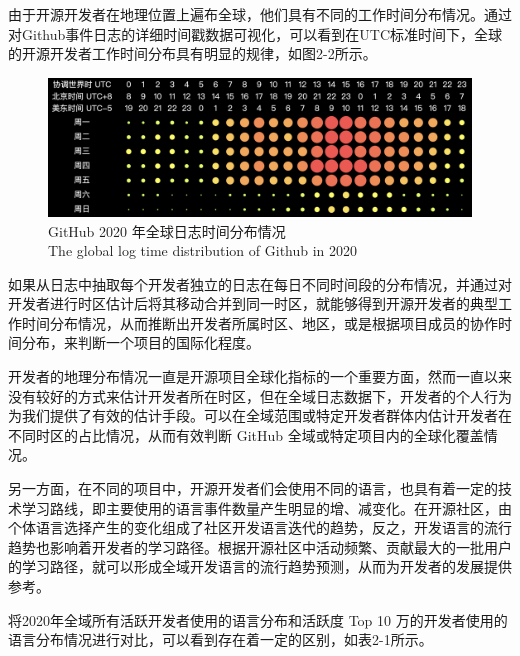 \par 由于开源开发者在地理位置上遍布全球，他们具有不同的工作时间分布情况。通过对Github事件日志的详细时间戳数据可视化，可以看到在UTC标准时间下，全球的开源开发者工作时间分布具有明显的规律，如图2-2所示。
\begin{figure}[H]
    \centering
    \includegraphics[width=130mm]{./figures/image2-2.png}
    \caption{GitHub 2020 年全球日志时间分布情况\\The global log time distribution of Github in 2020}
\end{figure}

\par 如果从日志中抽取每个开发者独立的日志在每日不同时间段的分布情况，并通过对开发者进行时区估计后将其移动合并到同一时区，就能够得到开源开发者的典型工作时间分布情况，从而推断出开发者所属时区、地区，或是根据项目成员的协作时间分布，来判断一个项目的国际化程度。

\par 开发者的地理分布情况一直是开源项目全球化指标的一个重要方面，然而一直以来没有较好的方式来估计开发者所在时区，但在全域日志数据下，开发者的个人行为为我们提供了有效的估计手段。可以在全域范围或特定开发者群体内估计开发者在不同时区的占比情况，从而有效判断 GitHub 全域或特定项目内的全球化覆盖情况。


\par 另一方面，在不同的项目中，开源开发者们会使用不同的语言，也具有着一定的技术学习路线，即主要使用的语言事件数量产生明显的增、减变化。在开源社区，由个体语言选择产生的变化组成了社区开发语言迭代的趋势，反之，开发语言的流行趋势也影响着开发者的学习路径。根据开源社区中活动频繁、贡献最大的一批用户的学习路径，就可以形成全域开发语言的流行趋势预测，从而为开发者的发展提供参考。

\par 将2020年全域所有活跃开发者使用的语言分布和活跃度 Top 10 万的开发者使用的语言分布情况进行对比，可以看到存在着一定的区别，如表2-1所示。

